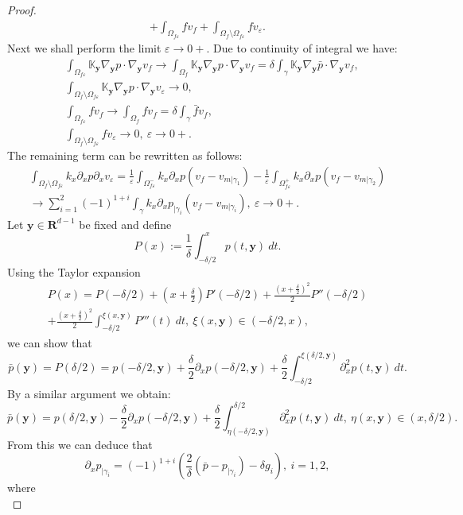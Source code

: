 \documentclass{llncs}
\def\vc#1{\mathbf{\boldsymbol{#1}}}     %
\def\tn#1{{\mathbb{#1}}}    %
\def\ep{\varepsilon}
\def\Real{{\mathbf R}}
\def\yy{{\vc y}}
\begin{document}
\begin{proof}
\begin{multline}
+ \int_{\Omega_{f\ep}} f v_f
+ \int_{\Omega_f\setminus\Omega_{f\ep}} f v_\ep.
\end{multline}
Next we shall perform the limit $\ep\to 0+$.
Due to continuity of integral we have:
\begin{align}
&\int_{\Omega_{f\ep}}\tn K_\yy\nabla_\yy p\cdot\nabla_\yy v_f \to \int_{\Omega_f}\tn K_\yy\nabla_\yy p\cdot\nabla_\yy v_f = \delta\int_\gamma\tn K_\yy\nabla_\yy\bar p\cdot\nabla_\yy v_f,\\
&\int_{\Omega_f\setminus\Omega_{f\ep}} \tn K_\yy\nabla_\yy p \cdot \nabla_\yy v_\ep \to 0, \\
&\int_{\Omega_{f\ep}} f v_f \to \int_{\Omega_f} f v_f = \delta\int_{\gamma} \bar f v_f, \\
&\int_{\Omega_f\setminus\Omega_{f\ep}} f v_\ep \to 0,~\ep\to 0+.
\end{align}
The remaining term can be rewritten as follows:
\begin{multline}
\int_{\Omega_f\setminus\Omega_{f\ep}} k_x\partial_x p \partial_x v_\ep
= \frac1\ep\int_{\Omega_{f\ep}^-} k_x\partial_x p (v_f-v_{m|\gamma_1})
- \frac1\ep\int_{\Omega_{f\ep}^+} k_x\partial_x p (v_f - v_{m|\gamma_2})\\
\to \sum_{i=1}^2(-1)^{1+i}\int_\gamma k_x \partial_x p_{|\gamma_i} (v_f - v_{m|\gamma_i}),~\ep\to 0+.
\end{multline}
Let $\vc y\in\Real^{d-1}$ be fixed and define
\[ P(x):=\frac1\delta\int_{-\delta/2}^{x}p(t,\vc y)~dt. \]
Using the Taylor expansion 
\begin{multline}
P(x) = P(-\delta/2) + (x+\frac\delta2)P'(-\delta/2) + \frac{(x+\frac\delta2)^2}{2}P''(-\delta/2)\\
+ \frac{(x+\frac\delta2)^2}2\int_{-\delta/2}^{\xi(x,\vc y)}P'''(t)~dt,~\xi(x,\vc y)\in(-\delta/2,x),
\end{multline}
we can show that
\[ \bar p(\vc y) = P(\delta/2) = p(-\delta/2,\vc y) + \frac\delta2\partial_x p(-\delta/2,\vc y) + \frac\delta2\int_{-\delta/2}^{\xi(\delta/2,\vc y)}\partial_x^2 p(t,\vc y)~dt. \]
By a similar argument we obtain:
\[ \bar p(\vc y) = p(\delta/2,\vc y) - \frac\delta2\partial_x p(-\delta/2,\vc y) + \frac\delta2\int_{\eta(-\delta/2,\vc y)}^{\delta/2}\partial_x^2 p(t,\vc y)~dt,~\eta(x,\vc y)\in(x,\delta/2). \]
From this we can deduce that
\begin{equation}
\label{eq:taylor_for_du}
\partial_x p_{|\gamma_i} = (-1)^{1+i}\left(\frac2\delta(\bar p - p_{|\gamma_i}) - \delta g_i\right),~i=1,2,
\end{equation}
where
\begin{equation}

\end{equation}
\end{proof}
\end{document}
